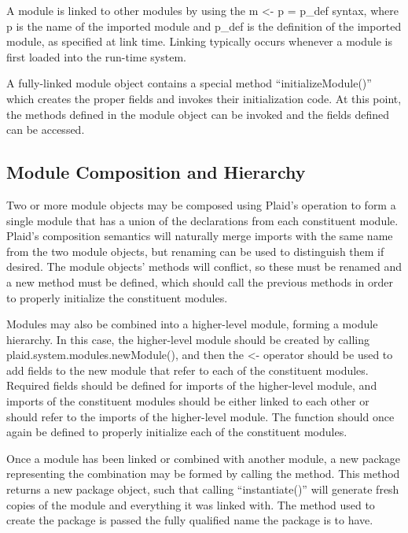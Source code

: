 A module is linked to other modules by using the m <- { p = p\_def }
syntax, where p is the name of the imported module and p\_def is the
definition of the imported module, as specified at link time.  Linking
typically occurs whenever a module is first loaded into the run-time
system.

A fully-linked module object contains a special method
``initializeModule()'' which creates the proper fields and invokes
their initialization code.  At this point, the methods defined in the
module object can be invoked and the fields defined can be accessed.


\subsection{Module Composition and Hierarchy}

Two or more module objects may be composed using Plaid's 
operation to form a single module that has a union of the declarations
from each constituent module.  Plaid's composition semantics will
naturally merge imports with the same name from the two module
objects, but renaming can be used to distinguish them if desired.  The
module objects'  methods will conflict, so
these must be renamed and a new  method must be
defined, which should call the previous 
methods in order to properly initialize the constituent modules.

Modules may also be combined into a higher-level module, forming a
module hierarchy.  In this case, the higher-level module should be
created by calling plaid.system.modules.newModule(), and then the <-
operator should be used to add fields to the new module that refer to
each of the constituent modules.  Required fields should be defined
for imports of the higher-level module, and imports of the constituent
modules should be either linked to each other or should refer
 to the imports of the higher-level module.  The
 function should once again be defined to
properly initialize each of the constituent modules.


Once a module has been linked or combined with another module, a new
package representing the combination may be formed by calling the
 method.  This method returns a new package object,
such that calling ``instantiate()'' will generate fresh copies of the
module and everything it was linked with.  The method used to create
the package is passed the fully qualified name the package is to have.

